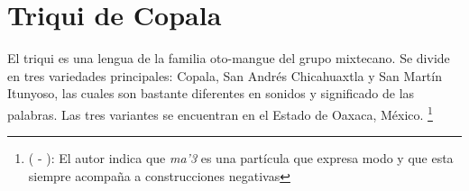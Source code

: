 \section*{Triqui de Copala}

\noindent El triqui es una lengua de la familia oto-mangue del grupo mixtecano. Se divide en tres variedades principales: Copala, San Andrés Chicahuaxtla y San Martín Itunyoso, las cuales son bastante diferentes en sonidos y significado de las palabras. Las tres variantes se encuentran en el Estado de Oaxaca, México.
\footnote{( - ): El autor indica que {\setmainfont{Charis SIL} \textit{ma'3}} es una partícula que expresa modo y que esta siempre acompaña a construcciones negativas}
\vspace{0.5cm}

